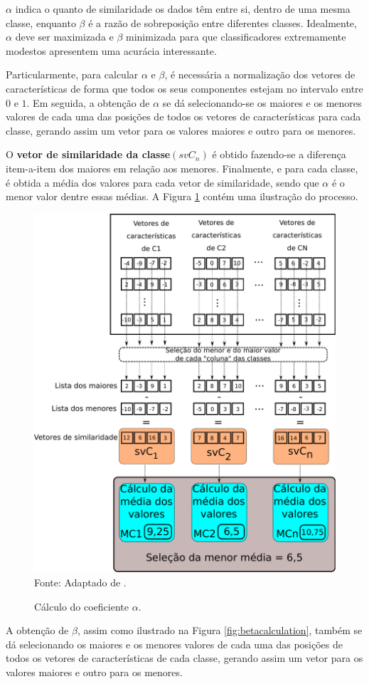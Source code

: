 \documentclass[a4paper,12pt,openright,oneside]{book}
\newenvironment{myenv}[1]
  {\begin{spacing}{#1}}
  {\end{spacing}}
\begin{document}
\begin{myenv}{1.5}
					\par $\alpha$ indica o quanto de similaridade os dados têm entre si, dentro de uma mesma classe, enquanto $\beta$ é a razão de sobreposição entre diferentes classes. Idealmente, $\alpha$ deve ser maximizada e $\beta$ minimizada para que classificadores extremamente modestos apresentem uma acurácia interessante.
					
					\par Particularmente, para calcular $\alpha$ e $\beta$, é necessária a normalização dos vetores de características de forma que todos os seus componentes estejam no intervalo entre $0$ e $1$. Em seguida, a obtenção de $\alpha$ se dá selecionando-se os maiores e os menores valores de cada uma das posições de todos os vetores de características para cada classe, gerando assim um vetor para os valores maiores e outro para os menores.
					
					\par O \textbf{vetor de similaridade da classe}$(svC_n)$ é obtido fazendo-se a diferença item-a-item dos maiores em relação aos menores. Finalmente, e para cada classe, é obtida a média dos valores para cada vetor de similaridade, sendo que $\alpha$ é o menor valor dentre essas médias. A Figura \ref{fig:calculoalpha} contém uma ilustração do processo.
					
					\begin{figure}[h]
						\centering
						\caption{Cálculo do coeficiente $\alpha$.}
						\includegraphics[width=0.5\linewidth]{images/calculoAlpha.pdf}
						\label{fig:calculoalpha}
						\\Fonte: Adaptado de \cite{8588433}.
					\end{figure}
					
					\par A obtenção de $\beta$, assim como ilustrado na Figura \ref{fig:betacalculation}, também se dá selecionando os maiores e os menores valores de cada uma das posições de todos os vetores de características de cada classe, gerando assim um vetor para os valores maiores e outro para os menores.
					

\end{myenv}
\end{document}
